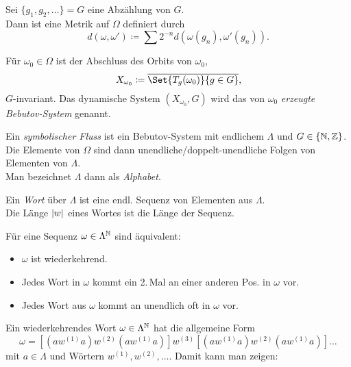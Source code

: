 \documentclass{cheat-sheet}
\newcommand{\clos}[1]{\overline{#1}} %
\begin{document}
\begin{bem}
  Sei $\{ g_1, g_2, \ldots \} = G$ eine Abzählung von $G$. \\
  Dann ist eine Metrik auf $\Omega$ definiert durch
  \[ d(\omega, \omega') \coloneqq \sum 2^{-n} d(\omega(g_n), \omega'(g_n)). \]
\end{bem}

\begin{defn}
  Für $\omega_0 \in \Omega$ ist der Abschluss des Orbits von $\omega_0$,
  \[ X_{\omega_0} \coloneqq \clos{\Set{T_g(\omega_0)}{g \in G}}, \]
  $G$-invariant. Das dynamische System $(X_{\omega_0}, G)$ wird das von $\omega_0$ \emph{erzeugte Bebutov-System} genannt.
\end{defn}

\begin{defn}
  Ein \emph{symbolischer Fluss} ist ein Bebutov-System mit endlichem $\Lambda$ und $G \in \{ \mathbb{N}, \mathbb{Z} \}$.
  Die Elemente von $\Omega$ sind dann unendliche/doppelt-unendliche Folgen von Elementen von $\Lambda$. \\
  Man bezeichnet $\Lambda$ dann als \emph{Alphabet}.
\end{defn}


\begin{defn}
  Ein \emph{Wort} über $\Lambda$ ist eine endl. Sequenz von Elementen aus $\Lambda$. \\
  Die Länge $\lvert w\rvert$ eines Wortes ist die Länge der Sequenz.
\end{defn}

\begin{prop}
  Für eine Sequenz $\omega \in \Lambda^{\mathbb{N}}$ sind äquivalent:
  \begin{itemize}
    \item $\omega$ ist wiederkehrend.
    \item Jedes Wort in $\omega$ kommt ein 2.\,Mal an einer anderen Pos. in $\omega$ vor.
    \item Jedes Wort aus $\omega$ kommt an unendlich oft in $\omega$ vor.
  \end{itemize}
\end{prop}

\begin{bem}
  Ein wiederkehrendes Wort $\omega \in \Lambda^{\mathbb{N}}$ hat die allgemeine Form
  \[ \omega = [(aw^{(1)}a)w^{(2)}(aw^{(1)}a)]w^{(3)}[(aw^{(1)}a)w^{(2)}(aw^{(1)}a)]\ldots \]
  mit $a \in \Lambda$ und Wörtern $w^{(1)}, w^{(2)}, \ldots$.
  Damit kann man zeigen:
\end{bem}
\end{document}

